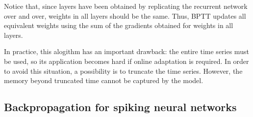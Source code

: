 Notice that, since layers have been obtained by replicating the recurrent network over and over,
 weights in all layers should be the same.
Thus, BPTT updates all equivalent weights using the sum of the gradients obtained for weights in all layers.

In practice, this alogithm has an important drawback: 
the entire time series must be used, 
so its application becomes hard if online adaptation is required. 
In order to avoid this situation, 
a possibility is to truncate the time series. However, the memory beyond truncated time 
cannot be captured by the model.

\subsection{Backpropagation for spiking neural networks}
